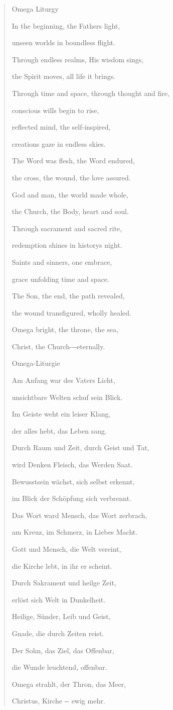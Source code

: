 \documentclass[
  ngerman,
]{article}
\begin{document}
\begin{quote}
Omega Liturgy

In the beginning, the Father\textquotesingle s light,

unseen worlds in boundless flight.

Through endless realms, His wisdom sings,

the Spirit moves, all life it brings.

Through time and space, through thought and fire,

conscious wills begin to rise,

reflected mind, the self-inspired,

creation\textquotesingle s gaze in endless skies.

The Word was flesh, the Word endured,

the cross, the wound, the love assured.

God and man, the world made whole,

the Church, the Body, heart and soul.

Through sacrament and sacred rite,

redemption shines in history\textquotesingle s night.

Saints and sinners, one embrace,

grace unfolding time and space.

The Son, the end, the path revealed,

the wound transfigured, wholly healed.

Omega bright, the throne, the sea,

Christ, the Church-\/-\/-eternally.

Omega-Liturgie

Am Anfang war des Vaters Licht,

unsichtbare Welten schuf sein Blick.

Im Geiste weht ein leiser Klang,

der alles hebt, das Leben sang.

Durch Raum und Zeit, durch Geist und Tat,

wird Denken Fleisch, das Werden Saat.

Bewusstsein wächst, sich selbst erkennt,

im Blick der Schöpfung sich verbrennt.

Das Wort ward Mensch, das Wort zerbrach,

am Kreuz, im Schmerz, in Liebes Macht.

Gott und Mensch, die Welt vereint,

die Kirche lebt, in ihr er scheint.

Durch Sakrament und heil\textquotesingle ge Zeit,

erlöst sich Welt in Dunkelheit.

Heilige, Sünder, Leib und Geist,

Gnade, die durch Zeiten reist.

Der Sohn, das Ziel, das Offenbar,

die Wunde leuchtend, offenbar.

Omega strahlt, der Thron, das Meer,

Christus, Kirche -\/- ewig mehr.
\end{quote}
\end{document}
